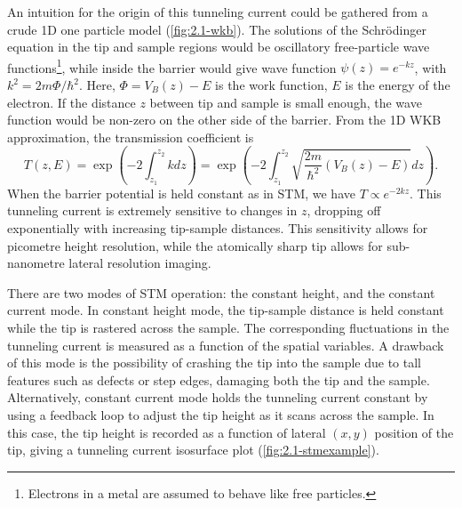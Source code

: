 \begin{figure} [h]
    \centering
    \caption{}
    \label{fig:2.1-stmsetup}
\end{figure}

An intuition for the origin of this tunneling current could be gathered from a crude \ac{1D} one particle model (\autoref{fig:2.1-wkb}). The solutions of the Schr\"odinger equation in the tip and sample regions would be oscillatory free-particle wave functions\footnote{Electrons in a metal are assumed to behave like free particles.}, while inside the barrier would give wave function $\psi(z) = e^{-kz}$, with $k^2 = 2m\Phi/\hbar^2$. Here, $\Phi = V_B(z) - E$ is the work function, $E$ is the energy of the electron. If the distance $z$ between tip and sample is small enough, the wave function would be non-zero on the other side of the barrier. From the \ac{1D} \ac{WKB} approximation, the transmission coefficient is
\begin{equation} \label{eq:intro:transfcn}
T(z,E) = \exp{\left(-2\int_{z_1} ^{z_2} k dz \right)} = \exp{\left(-2  \int_{z_1}^{z_2} \sqrt{\frac{2m}{\hbar^2}(V_B(z) - E)} dz \right)}.
\end{equation}
When the barrier potential is held constant as in \ac{STM}, we have $T \propto e^{-2kz}$. This tunneling current is extremely sensitive to changes in $z$, dropping off exponentially with increasing tip-sample distances. This sensitivity allows for picometre height resolution, while the atomically sharp tip allows for sub-nanometre lateral resolution imaging.


\begin{figure} [h]
    \centering
    \caption{}
    \label{fig:2.1-wkb}
\end{figure}


There are two modes of \ac{STM} operation: the constant height, and the constant current mode. In constant height mode, the tip-sample distance is held constant while the tip is rastered across the sample. The corresponding fluctuations in the tunneling current is measured as a function of the spatial variables. A drawback of this mode is the possibility of crashing the tip into the sample due to tall features such as defects or step edges, damaging both the tip and the sample. Alternatively, constant current mode holds the tunneling current constant by using a feedback loop to adjust the tip height as it scans across the sample. In this case, the tip height is recorded as a function of lateral $(x,y)$ position of the tip, giving a tunneling current isosurface plot (\autoref{fig:2.1-stmexample}).

